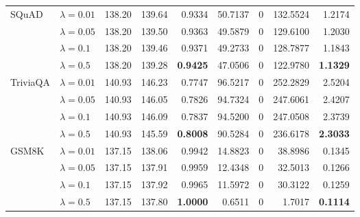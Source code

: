 \begin{table}[t]
{\begin{tabular}{l l rrrrrrr}
SQuAD & $\lambda{=}0.01$ & 138.20 & 139.64 & \cellcolor{red!18} 0.9334 & \cellcolor{red!18} 50.7137 & \cellcolor{cyan!12} $0$ & \cellcolor{red!18} 132.5524 & \cellcolor{red!18} 1.2174 \\
 & $\lambda{=}0.05$ & 138.20 & 139.50 & \cellcolor{red!18} 0.9363 & \cellcolor{red!18} 49.5879 & \cellcolor{cyan!12} $0$ & \cellcolor{red!18} 129.6100 & \cellcolor{red!18} 1.2030 \\
 & $\lambda{=}0.1$ & 138.20 & 139.46 & \cellcolor{red!18} 0.9371 & \cellcolor{red!18} 49.2733 & \cellcolor{cyan!12} $0$ & \cellcolor{red!18} 128.7877 & \cellcolor{red!18} 1.1843 \\
 & $\lambda{=}0.5$ & 138.20 & 139.28 & \cellcolor{red!18} \textbf{0.9425} & \cellcolor{red!18} 47.0506 & \cellcolor{cyan!12} $0$ & \cellcolor{red!18} 122.9780 & \cellcolor{red!18} \textbf{1.1329} \\
\midrule
TriviaQA & $\lambda{=}0.01$ & 140.93 & 146.23 & \cellcolor{red!35} 0.7747 & \cellcolor{red!35} 96.5217 & \cellcolor{cyan!12} $0$ & \cellcolor{red!35} 252.2829 & \cellcolor{red!35} 2.5204 \\
 & $\lambda{=}0.05$ & 140.93 & 146.05 & \cellcolor{red!35} 0.7826 & \cellcolor{red!35} 94.7324 & \cellcolor{cyan!12} $0$ & \cellcolor{red!35} 247.6061 & \cellcolor{red!35} 2.4207 \\
 & $\lambda{=}0.1$ & 140.93 & 146.09 & \cellcolor{red!35} 0.7837 & \cellcolor{red!35} 94.5200 & \cellcolor{cyan!12} $0$ & \cellcolor{red!35} 247.0508 & \cellcolor{red!35} 2.3739 \\
 & $\lambda{=}0.5$ & 140.93 & 145.59 & \cellcolor{red!18} \textbf{0.8008} & \cellcolor{red!18} 90.5284 & \cellcolor{cyan!12} $0$ & \cellcolor{red!18} 236.6178 & \cellcolor{red!18} \textbf{2.3033} \\
\midrule
GSM8K & $\lambda{=}0.01$ & 137.15 & 138.06 & 0.9942 & 14.8823 & \cellcolor{cyan!12} $0$ & 38.8986 & 0.1345 \\
 & $\lambda{=}0.05$ & 137.15 & 137.91 & 0.9959 & 12.4348 & \cellcolor{cyan!12} $0$ & 32.5013 & 0.1266 \\
 & $\lambda{=}0.1$ & 137.15 & 137.92 & 0.9965 & 11.5972 & \cellcolor{cyan!12} $0$ & 30.3122 & 0.1259 \\
 & $\lambda{=}0.5$ & 137.15 & 137.80 & \textbf{1.0000} & 0.6511 & \cellcolor{cyan!12} $0$ & 1.7017 & \textbf{0.1114} \\
\bottomrule
\end{tabular}}
\end{table}